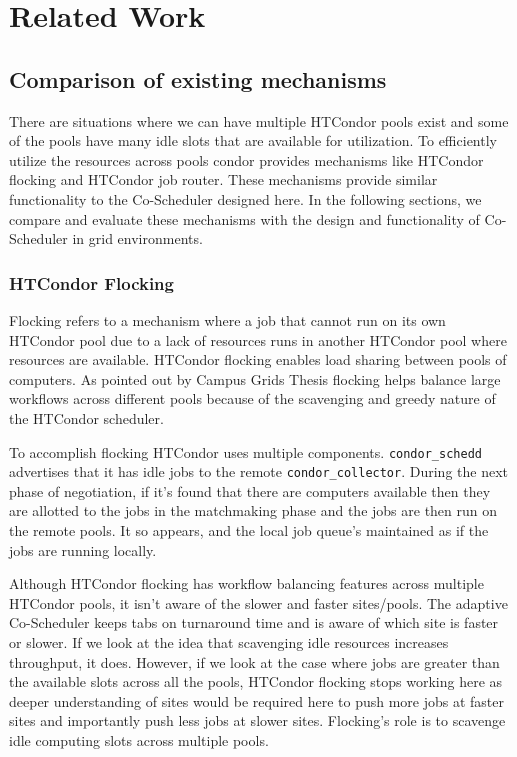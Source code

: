 \documentclass[ms,electronic,double]{nuthesis}
\begin{document}
\chapter{Related Work}

\section{Comparison of existing mechanisms}
There are situations where we can have multiple HTCondor pools exist and some of 
the pools have many idle slots that are available for utilization. To efficiently utilize the resources across pools condor provides 
mechanisms like HTCondor flocking and HTCondor job router. These mechanisms 
provide similar functionality to the Co-Scheduler designed here. In the following sections, we compare 
and evaluate these mechanisms with the design and functionality of Co-Scheduler in grid environments.

\subsection{HTCondor Flocking}
Flocking refers to a mechanism where a job that cannot run on its own HTCondor pool 
due to a lack of resources runs in another HTCondor pool where resources are 
available. HTCondor flocking enables load sharing between pools of computers. As 
pointed out by Campus Grids Thesis\cite{derekThesis} flocking helps balance large workflows across different pools because of the scavenging and greedy nature 
of the HTCondor scheduler.

To accomplish flocking HTCondor uses multiple components. 
\texttt{condor\_schedd} advertises that it has idle jobs to the remote \texttt{condor\_collector}. During the next phase of negotiation, if it's found that there are computers 
available then they are allotted to the jobs in the matchmaking phase and the 
jobs are then run on the remote pools. It so appears, and the local job queue's maintained as if 
the jobs are running locally. 

Although HTCondor flocking has workflow balancing features across multiple HTCondor 
pools, it isn't aware of the slower and faster sites/pools. The adaptive Co-Scheduler 
keeps tabs on turnaround time and is aware of which site is faster or slower. If we 
look at the idea that scavenging idle resources increases throughput, it does. However, if we look at the case where jobs are greater than the available slots 
across all the pools, HTCondor flocking stops working here as deeper understanding of sites
would be required here to push more jobs at faster sites and importantly push less jobs
at slower sites. Flocking's role is to scavenge idle computing slots across multiple pools. 
\end{document}
